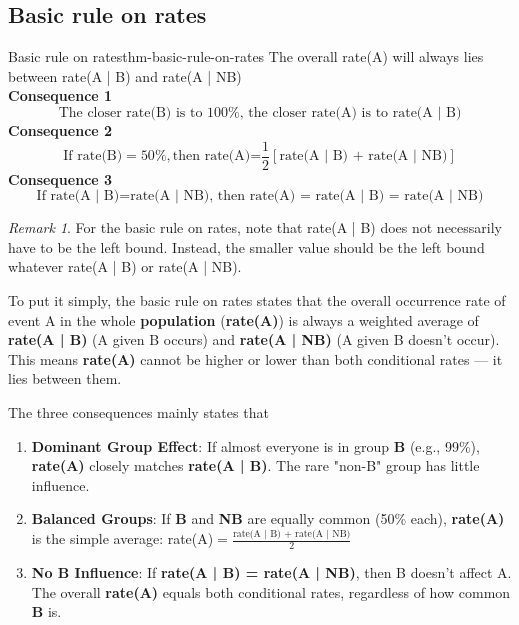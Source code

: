 \documentclass[math,code]{amznotes}
\theoremstyle{remark}
\newtheorem*{remark}{Remark}
\begin{document}
\subsection{Basic rule on rates}
\begin{thmbox}{Basic rule on rates}{thm-basic-rule-on-rates}
    The overall rate(A) will always lies between rate(A | B) and rate(A | NB) \\
    \textbf{Consequence 1}
    \begin{displaymath}
        \text{The closer rate(B) is to 100\%, the closer rate(A) is to rate(A | B)}
    \end{displaymath}
    \textbf{Consequence 2}
    \begin{displaymath}
        \text{If rate(B)}=50\%, \text{then rate(A)=}\frac{1}{2}[\text{rate(A | B) + rate(A | NB)}]
    \end{displaymath}
    \textbf{Consequence 3}
    \begin{displaymath}
        \text{If rate(A | B)}=\text{rate(A | NB), then rate(A) = rate(A | B) = rate(A | NB)}
    \end{displaymath}
\end{thmbox}
\begin{notebox}
    \begin{remark}
        For the basic rule on rates, note that rate(A | B) does not necessarily have to be the left bound. Instead, the smaller value should be the left bound whatever rate(A | B) or rate(A | NB).
    \end{remark}
\end{notebox}
To put it simply, the basic rule on rates states that the overall occurrence rate of event A in the whole \textbf{population} (\textbf{rate(A)}) is always a weighted average of \textbf{rate(A | B)} (A given B occurs) and \textbf{rate(A | NB)} (A given B doesn't occur). This means \textbf{rate(A)} cannot be higher or lower than both conditional rates — it lies between them.

The three consequences mainly states that
\begin{enumerate}
    \item \textbf{Dominant Group Effect}: If almost everyone is in group \textbf{B} (e.g., 99\%), \textbf{rate(A)} closely matches \textbf{rate(A | B)}. The rare "non-B" group has little influence.
    \item \textbf{Balanced Groups}: If \textbf{B} and \textbf{NB} are equally common (50\% each), \textbf{rate(A)} is the simple average: rate(A)$=\frac{\text{rate(A | B) + rate(A | NB)}}{2}$
    \item \textbf{No B Influence}: If \textbf{rate(A | B) = rate(A | NB)}, then B doesn’t affect A. The overall \textbf{rate(A)} equals both conditional rates, regardless of how common \textbf{B} is.
\end{enumerate}
\end{document}
